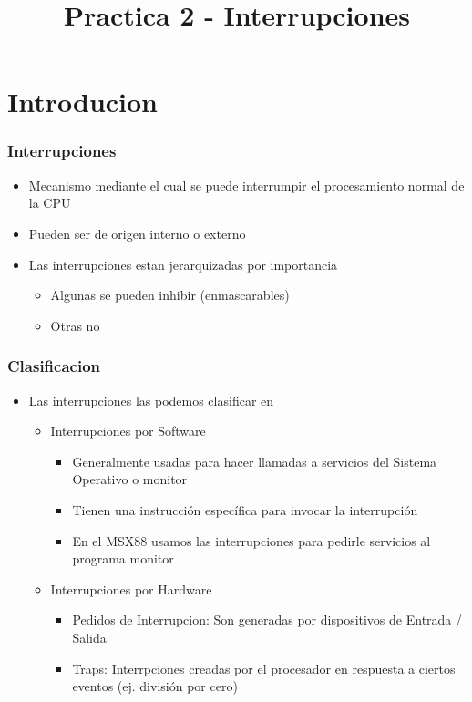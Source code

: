 \documentclass{beamer}
\title{Practica 2 - Interrupciones}
\begin{document}
\begin{frame}
\titlepage
\end{frame}

\section{Introducion}

\begin{frame}
\frametitle{Interrupciones}
\begin{itemize}
 \item Mecanismo mediante el cual se puede interrumpir el procesamiento normal de la CPU
 \item Pueden ser de origen interno o externo
 \item Las interrupciones estan jerarquizadas por importancia
 \begin{itemize}
   \item Algunas se pueden inhibir (enmascarables)
   \item Otras no
 \end{itemize}
 \end{itemize}
\end{frame}

\begin{frame}
\frametitle{Clasificacion}
\begin{itemize}
 \item Las interrupciones las podemos clasificar en
 \begin{itemize}

 \item Interrupciones por Software
 \begin{itemize}
   \item Generalmente usadas para hacer llamadas a servicios del Sistema Operativo o monitor
   \item Tienen una instrucción específica para invocar la interrupción
   \item En el MSX88 usamos las interrupciones para pedirle servicios al programa monitor
 \end{itemize}

 \item Interrupciones por Hardware
 \begin{itemize}
   \item Pedidos de Interrupcion: Son generadas por dispositivos de Entrada / Salida
   \item Traps: Interrpciones creadas por el procesador en respuesta a ciertos eventos (ej. división por cero)
 \end{itemize}
 \end{itemize}
 \end{itemize}

\end{frame}
\end{document}
